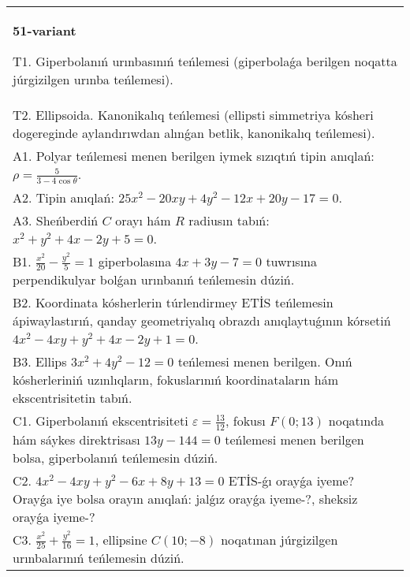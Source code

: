 \documentclass{article}
\begin{document}
\begin{tabular}{m{17cm}}
\textbf{51-variant}
\newline

T1. Giperbolanıń urınbasınıń teńlemesi (giperbolaǵa berilgen noqatta júrgizilgen urınba teńlemesi).\\

T2. Ellipsoida. Kanonikalıq teńlemesi (ellipsti simmetriya kósheri dogereginde aylandırıwdan alınǵan betlik, kanonikalıq teńlemesi).\\

A1. Polyar teńlemesi menen berilgen iymek sızıqtıń tipin anıqlań: $\rho=\frac{5}{3-4\cos\theta}$.\\

A2. Tipin anıqlań: $25 x^{2}-20 xy+4 y^{2}-12 x+20 y-17=0$.\\

A3. Sheńberdiń $C$ orayı hám $R$ radiusın tabıń: $x^2+y^2+4 x-2 y+5=0$.\\

B1. $\frac{x^{2}}{20} - \frac{y^{2}}{5} = 1$ giperbolasına $4x + 3y - 7 = 0$ tuwrısına perpendikulyar bolǵan urınbanıń teńlemesin dúziń.  \\

B2. Koordinata kósherlerin túrlendirmey ETİS teńlemesin ápiwaylastırıń, qanday geometriyalıq obrazdı anıqlaytuǵının kórsetiń $4x^{2} - 4xy + y^{2} + 4x - 2y + 1 = 0$.  \\

B3. Ellips $3x^{2} + 4y^{2} - 12 = 0$ teńlemesi menen berilgen. Onıń kósherleriniń uzınlıqların, fokuslarınıń koordinataların hám ekscentrisitetin tabıń.  \\

C1. Giperbolanıń ekscentrisiteti $\varepsilon = \frac{13}{12}$, fokusı $F(0;13)$ noqatında hám sáykes direktrisası $13y - 144 = 0$ teńlemesi menen berilgen bolsa, giperbolanıń teńlemesin dúziń.  \\

C2. $4x^{2} - 4xy + y^{2} - 6x + 8y + 13 = 0$ ETİS-ǵı orayǵa iyeme? Orayǵa iye bolsa orayın anıqlań: jalǵız orayǵa iyeme-?, sheksiz orayǵa iyeme-?  \\

C3. $\frac{x^{2}}{25} + \frac{y^{2}}{16} = 1$, ellipsine $C(10; - 8)$ noqatınan júrgizilgen urınbalarınıń teńlemesin dúziń.  \\

\end{tabular}
\vspace{1cm}
\end{document}
